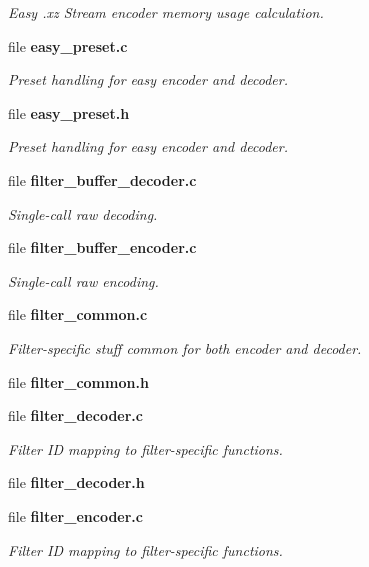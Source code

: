 \begin{DoxyCompactItemize}
\begin{DoxyCompactList}\small\item\em Easy .xz Stream encoder memory usage calculation. \end{DoxyCompactList}\item 
file {\bf easy\-\_\-preset.\-c}
\begin{DoxyCompactList}\small\item\em Preset handling for easy encoder and decoder. \end{DoxyCompactList}\item 
file {\bf easy\-\_\-preset.\-h}
\begin{DoxyCompactList}\small\item\em Preset handling for easy encoder and decoder. \end{DoxyCompactList}\item 
file {\bf filter\-\_\-buffer\-\_\-decoder.\-c}
\begin{DoxyCompactList}\small\item\em Single-\/call raw decoding. \end{DoxyCompactList}\item 
file {\bf filter\-\_\-buffer\-\_\-encoder.\-c}
\begin{DoxyCompactList}\small\item\em Single-\/call raw encoding. \end{DoxyCompactList}\item 
file {\bf filter\-\_\-common.\-c}
\begin{DoxyCompactList}\small\item\em Filter-\/specific stuff common for both encoder and decoder. \end{DoxyCompactList}\item 
file {\bfseries filter\-\_\-common.\-h}
\item 
file {\bf filter\-\_\-decoder.\-c}
\begin{DoxyCompactList}\small\item\em Filter I\-D mapping to filter-\/specific functions. \end{DoxyCompactList}\item 
file {\bfseries filter\-\_\-decoder.\-h}
\item 
file {\bf filter\-\_\-encoder.\-c}
\begin{DoxyCompactList}\small\item\em Filter I\-D mapping to filter-\/specific functions. \end{DoxyCompactList}\item 

\end{DoxyCompactItemize}
